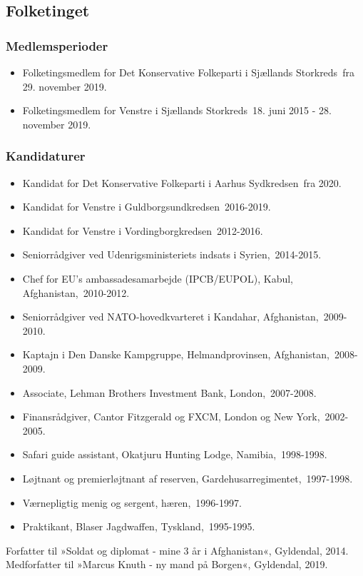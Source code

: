 \documentclass[11pt, a4paper]{awesome-cv}
\begin{document}
\begin{cvletter}
\subsection*{Folketinget}
\subsubsection*{Medlemsperioder}
\begin{itemize}
\item Folketingsmedlem for Det Konservative Folkeparti i Sjællands Storkreds fra 29. november 2019.
\item Folketingsmedlem for Venstre i Sjællands Storkreds 18. juni 2015 - 28. november 2019.
\end{itemize}
\subsubsection*{Kandidaturer}
\begin{itemize}
\item Kandidat for Det Konservative Folkeparti i Aarhus Sydkredsen fra 2020.
\item Kandidat for Venstre i Guldborgsundkredsen 2016-2019.
\item Kandidat for Venstre i Vordingborgkredsen 2012-2016.
\end{itemize}
\begin{itemize}
\item Seniorrådgiver ved Udenrigsministeriets indsats i Syrien, 2014-2015.
\item Chef for EU's ambassadesamarbejde (IPCB/EUPOL), Kabul, Afghanistan, 2010-2012.
\item Seniorrådgiver ved NATO-hovedkvarteret i Kandahar, Afghanistan, 2009-2010.
\item Kaptajn i Den Danske Kampgruppe, Helmandprovinsen, Afghanistan, 2008-2009.
\item Associate, Lehman Brothers Investment Bank, London, 2007-2008.
\item Finansrådgiver, Cantor Fitzgerald og FXCM, London og New York, 2002-2005.
\item Safari guide assistant, Okatjuru Hunting Lodge, Namibia, 1998-1998.
\item Løjtnant og premierløjtnant af reserven, Gardehusarregimentet, 1997-1998.
\item Værnepligtig menig og sergent, hæren, 1996-1997.
\item Praktikant, Blaser Jagdwaffen, Tyskland, 1995-1995.
\end{itemize}
Forfatter til »Soldat og diplomat - mine 3 år i Afghanistan«, Gyldendal, 2014. 
Medforfatter til »Marcus Knuth - ny mand på Borgen«, Gyldendal, 2019.

\end{cvletter}
\end{document}
